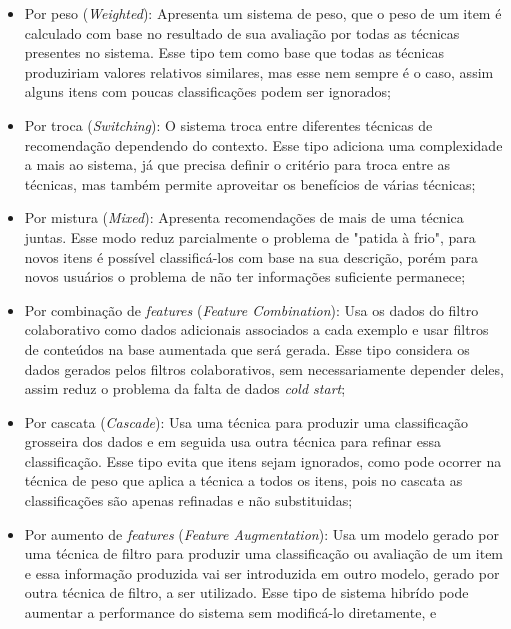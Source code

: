 \begin{itemize}
    \item Por peso (\textit{Weighted}): Apresenta um sistema de peso, que o peso de um item é calculado com base no resultado
    de sua avaliação por todas as técnicas presentes no sistema. Esse tipo tem como base que todas as técnicas produziriam
    valores relativos similares, mas esse nem sempre é o caso, assim alguns itens com poucas classificações podem ser ignorados;

    \item Por troca (\textit{Switching}): O sistema troca entre diferentes técnicas de recomendação dependendo do contexto.
    Esse tipo adiciona uma complexidade a mais ao sistema, já que precisa definir o critério para troca entre as técnicas,
    mas também permite aproveitar os benefícios de várias técnicas;

    \item Por mistura (\textit{Mixed}): Apresenta recomendações de mais de uma técnica juntas. Esse modo reduz parcialmente
    o problema de "patida à frio", para novos itens é possível classificá-los com base na sua descrição, porém para novos
    usuários o problema de não ter informações suficiente permanece; 

    \item Por combinação de \textit{features} (\textit{Feature Combination}): Usa os dados do filtro colaborativo como dados
    adicionais associados a cada exemplo e usar filtros de conteúdos na base aumentada que será gerada. Esse tipo considera
    os dados gerados pelos filtros colaborativos, sem necessariamente depender deles, assim reduz o problema da falta de dados
    \textit{cold start};

    \item Por cascata (\textit{Cascade}): Usa uma técnica para produzir uma classificação grosseira dos dados e em seguida
    usa outra técnica para refinar essa classificação. Esse tipo evita que itens sejam ignorados, como pode ocorrer na técnica
    de peso que aplica a técnica a todos os itens, pois no cascata as classificações são apenas refinadas e não substituidas; 

    \item Por aumento de \textit{features} (\textit{Feature Augmentation}): Usa um modelo gerado por uma técnica de filtro
    para produzir uma classificação ou avaliação de um item e essa informação produzida vai ser introduzida em outro 
    modelo, gerado por outra técnica de filtro, a ser utilizado. Esse tipo de
    sistema hibrído pode aumentar a performance do sistema sem modificá-lo diretamente, e


\end{itemize}
